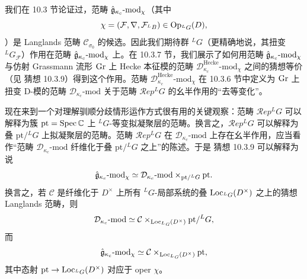 我们在 10.3 节论证过，范畴 $\hat{\mathfrak{g}}_{\kappa_c}\text{-}\mathrm{mod}_\chi$（其中
\[
    \chi=(\mathcal{F},\nabla,\mathcal{F}_{{}^L B})\in\operatorname{Op}_{{}^L G}(D),
\]
）是 Langlands 范畴 $\mathcal{C}_{\sigma_0}$ 的候选。因此我们期待群 ${}^L G$（更精确地说，其扭变 ${}^L G_{\mathcal{F}}$）作用在范畴 $\hat{\mathfrak{g}}_{\kappa_c}\text{-}\mathrm{mod}_\chi$ 上。在 10.3.7 节，我们展示了如何用范畴 $\hat{\mathfrak{g}}_{\kappa_c}\text{-}\mathrm{mod}_\chi$ 与仿射 Grassmann 流形 $\operatorname{Gr}$ 上 Hecke 本征模的范畴 $\mathcal{D}^{\mathrm{Hecke}}_{\kappa_c}\text{-}\mathrm{mod}_\chi$ 之间的猜想等价（见 猜想 10.3.9）得到这个作用。范畴 $\mathcal{D}^{\mathrm{Hecke}}_{\kappa_c}\text{-}\mathrm{mod}_\chi$ 在 10.3.6 节中定义为 $\operatorname{Gr}$ 上扭变 D-模的范畴 $\mathcal{D}_{\kappa_c}\text{-}\mathrm{mod}$ 关于范畴 $\mathcal{R}ep{}^L G$ 的幺半作用的“去等变化”。

现在来到一个对理解驯顺分歧情形运作方式很有用的关键观察：范畴 $\mathcal{R}ep{}^L G$ 可以解释为簇 $\mathrm{pt}=\operatorname{Spec}\mathbb{C}$ 上 ${}^L G$-等变拟凝聚层的范畴。换言之，$\mathcal{R}ep{}^L G$ 可以解释为叠 $\mathrm{pt}/{}^L G$ 上拟凝聚层的范畴。范畴 $\mathcal{R}ep{}^L G$ 在 $\mathcal{D}_{\kappa_c}\text{-}\mathrm{mod}$ 上存在幺半作用，应当看作“范畴 $\mathcal{D}_{\kappa_c}\text{-}\mathrm{mod}$ 纤维化于叠 $\mathrm{pt}/{}^L G$ 之上”的陈述。于是 猜想 10.3.9 可以解释为说
\[
    \hat{\mathfrak{g}}_{\kappa_c}\text{-}\mathrm{mod}_\chi
    \simeq\mathcal{D}_{\kappa_c}\text{-}\mathrm{mod}
    \times_{\mathrm{pt}/{}^L G}\mathrm{pt}.
\]
换言之，若 $\mathcal{C}$ 是纤维化于 $D^\times$ 上所有 ${}^L G$-局部系统的叠 $\operatorname{Loc}_{{}^L G}(D^\times)$ 之上的猜想 Langlands 范畴，则
\[
    \mathcal{D}_{\kappa_c}\text{-}\mathrm{mod}
    \simeq\mathcal{C}\times_{\operatorname{Loc}_{{}^L G}(D^\times)}\mathrm{pt}/{}^L G,
\]
而
\[
    \hat{\mathfrak{g}}_{\kappa_c}\text{-}\mathrm{mod}_\chi
    \simeq\mathcal{C}\times_{\operatorname{Loc}_{{}^L G}(D^\times)}\mathrm{pt},
\]
其中态射 $\mathrm{pt}\to\operatorname{Loc}_{{}^L G}(D^\times)$ 对应于 oper $\chi$。

